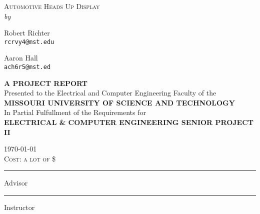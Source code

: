 \begin{titlepage}

\begin{center}
\textsc{\LARGE Automotive Heads Up Display} \\[2cm]

\textit{by} \\[0.5cm]

\begin{multicols}{2}
Robert Richter\\
\texttt{rcrvy4@mst.edu}\\

\columnbreak

Aaron Hall\\
\texttt{ach6r5@mst.ed}
\end{multicols}

\vspace{3 cm}

\textsc{\small \textbf{A PROJECT REPORT}} \\[0.5cm]
{\small Presented to the Electrical and Computer Engineering Faculty of the} \\[0.5cm]
\textsc{\small \textbf{MISSOURI UNIVERSITY OF SCIENCE AND TECHNOLOGY}} \\[0.5cm]
{\small In Partial Fulfullment of the Requirements for} \\[0.5cm]
\textsc{\small \textbf{ELECTRICAL \& COMPUTER ENGINEERING SENIOR PROJECT II}} \\[1cm]

\vfill

\textsc{\today} \\[3mm]
\textsc{Cost: a lot of \$} \\[2cm]

\begin{multicols}{2}
\hrule
\vspace{1mm}
Advisor\\
\columnbreak
\hrule
\vspace{1mm}
Instructor
\end{multicols}

\end{center}
\end{titlepage}
